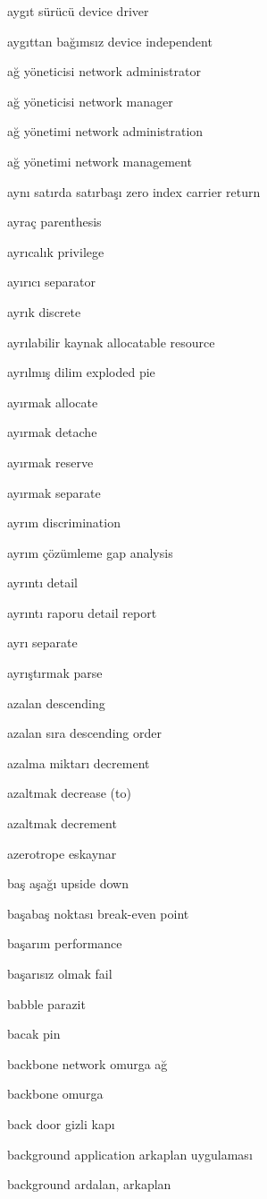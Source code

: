 \documentclass[12pt,fleqn]{article}\usepackage{../../common}
\begin{document}
aygıt sürücü device driver

aygıttan bağımsız device independent

ağ yöneticisi network administrator

ağ yöneticisi network manager

ağ yönetimi network administration

ağ yönetimi network management

aynı satırda satırbaşı zero index carrier return

ayraç parenthesis

ayrıcalık privilege

ayırıcı separator

ayrık discrete

ayrılabilir kaynak allocatable resource

ayrılmış dilim exploded pie

ayırmak allocate

ayırmak detache

ayırmak reserve

ayırmak separate

ayrım discrimination

ayrım çözümleme gap analysis

ayrıntı detail

ayrıntı raporu detail report

ayrı separate

ayrıştırmak parse

azalan descending

azalan sıra descending order

azalma miktarı decrement

azaltmak decrease (to)

azaltmak decrement

azerotrope eskaynar

baş aşağı upside down

başabaş noktası break-even point

başarım performance

başarısız olmak fail

babble parazit

bacak pin

backbone network omurga ağ

backbone omurga

back door gizli kapı

background application arkaplan uygulaması

background ardalan, arkaplan
\end{document}
